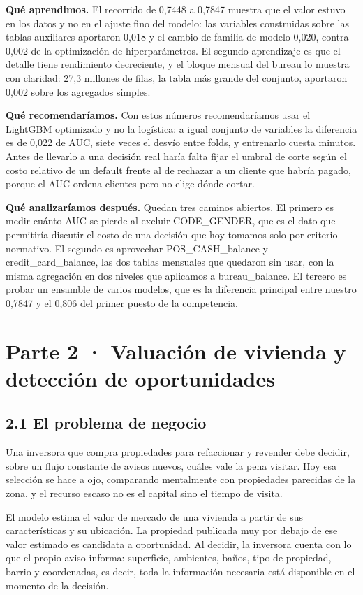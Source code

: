 \documentclass[11pt,a4paper]{article}
\begin{document}
\textbf{Qué aprendimos.} El recorrido de 0,7448 a 0,7847 muestra que el valor estuvo en los datos y no en el ajuste fino del modelo: las variables construidas sobre las tablas auxiliares aportaron 0,018 y el cambio de familia de modelo 0,020, contra 0,002 de la optimización de hiperparámetros. El segundo aprendizaje es que el detalle tiene rendimiento decreciente, y el bloque mensual del bureau lo muestra con claridad: 27,3 millones de filas, la tabla más grande del conjunto, aportaron 0,002 sobre los agregados simples.

\textbf{Qué recomendaríamos.} Con estos números recomendaríamos usar el LightGBM optimizado y no la logística: a igual conjunto de variables la diferencia es de 0,022 de AUC, siete veces el desvío entre folds, y entrenarlo cuesta minutos. Antes de llevarlo a una decisión real haría falta fijar el umbral de corte según el costo relativo de un default frente al de rechazar a un cliente que habría pagado, porque el AUC ordena clientes pero no elige dónde cortar.

\textbf{Qué analizaríamos después.} Quedan tres caminos abiertos. El primero es medir cuánto AUC se pierde al excluir CODE\_GENDER, que es el dato que permitiría discutir el costo de una decisión que hoy tomamos solo por criterio normativo. El segundo es aprovechar POS\_CASH\_balance y credit\_card\_balance, las dos tablas mensuales que quedaron sin usar, con la misma agregación en dos niveles que aplicamos a bureau\_balance. El tercero es probar un ensamble de varios modelos, que es la diferencia principal entre nuestro 0,7847 y el 0,806 del primer puesto de la competencia.

\section*{Parte 2 · Valuación de vivienda y detección de oportunidades}

\subsection*{2.1 El problema de negocio}

Una inversora que compra propiedades para refaccionar y revender debe decidir, sobre un flujo constante de avisos nuevos, cuáles vale la pena visitar. Hoy esa selección se hace a ojo, comparando mentalmente con propiedades parecidas de la zona, y el recurso escaso no es el capital sino el tiempo de visita.

El modelo estima el valor de mercado de una vivienda a partir de sus características y su ubicación. La propiedad publicada muy por debajo de ese valor estimado es candidata a oportunidad. Al decidir, la inversora cuenta con lo que el propio aviso informa: superficie, ambientes, baños, tipo de propiedad, barrio y coordenadas, es decir, toda la información necesaria está disponible en el momento de la decisión.
\end{document}
